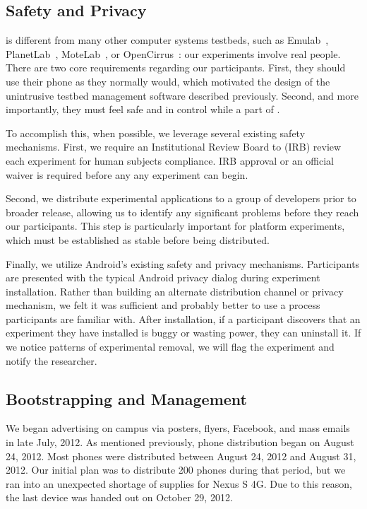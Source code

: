 \subsection{Safety and Privacy}

\PhoneLab{} is different from many other computer systems testbeds, such as
Emulab~\cite{white:osdi:2002, emulab}, PlanetLab~\cite{peterson:ccr:2003,
planetlab}, MoteLab~\cite{werner-allen:ipsn:2005}, or
OpenCirrus~\cite{avetisyan:computer:2010, opencirrus}: our experiments involve
real people. There are two core requirements regarding our participants. First,
they should use their phone as they normally would, which motivated the design
of the unintrusive testbed management software described previously. Second, and
more importantly, they must feel safe and in control while a part of
\PhoneLab{}.

To accomplish this, when possible, we leverage several existing safety
mechanisms. First, we require an Institutional Review Board to (IRB) review
each \PhoneLab{} experiment for human subjects compliance. IRB approval or an
official waiver is required before any \PhoneLab{} any experiment can begin.

Second, we distribute experimental applications to a group of developers
prior to broader release, allowing us to identify any significant problems
before they reach our participants. This step is particularly important for
platform experiments, which must be established as stable before being
distributed.

Finally, we utilize Android's existing safety and privacy mechanisms.
Participants are presented with the typical Android privacy dialog during
experiment installation. Rather than building an alternate distribution
channel or privacy mechanism, we felt it was sufficient and probably better
to use a process participants are familiar with. After installation, if a
participant discovers that an experiment they have installed is buggy or
wasting power, they can uninstall it. If we notice patterns of experimental
removal, we will flag the experiment and notify the researcher.

\subsection{Bootstrapping and Management}

We began advertising \PhoneLab{} on campus via posters, flyers, Facebook, and
mass emails in late July, 2012. As mentioned previously, \PhoneLab{} phone
distribution began on August 24, 2012. Most phones were distributed between
August 24, 2012 and August 31, 2012. Our initial plan was to distribute 200
phones during that period, but we ran into an unexpected shortage of
supplies for Nexus S 4G. Due to this reason, the last device was handed out on
October 29, 2012.

